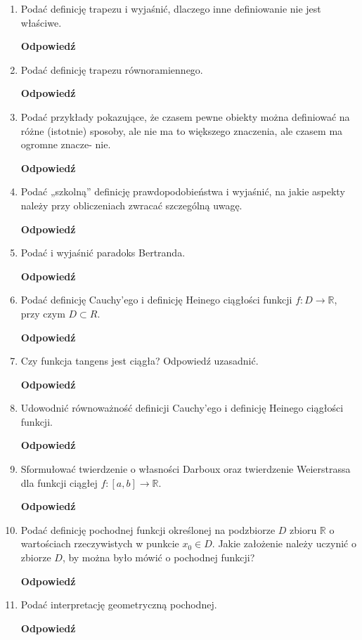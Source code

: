 \documentclass[12pt,a4paper]{article}
\newcounter{twierdzenie}
\theoremstyle{break}
\newcommand{\Odp}[1]{
		\begin{mdframed}[style=zadanie]
			\textbf{Odpowiedź}\\
			#1
		\end{mdframed}
	}
\begin{document}
\begin{enumerate}[1.]
{	}
	
	\item Podać definicję trapezu i wyjaśnić, dlaczego inne definiowanie nie jest właściwe.
	\Odp{
	
	}
	
	\item Podać definicję trapezu równoramiennego.
	\Odp{
	
	}
	
	\item Podać przykłady pokazujące, że czasem pewne obiekty można definiować na różne
	(istotnie) sposoby, ale nie ma to większego znaczenia, ale czasem ma ogromne znacze-
	nie.
	\Odp{
	
	}
	
	\item Podać „szkolną” definicję prawdopodobieństwa i wyjaśnić, na jakie aspekty należy
	przy obliczeniach zwracać szczególną uwagę.
	\Odp{
	
	}
	
	\item Podać i wyjaśnić paradoks Bertranda.
	\Odp{
	
	}
	
	\item Podać definicję Cauchy’ego i definicję Heinego ciągłości funkcji $f : D \rightarrow \mathbb{R}$, przy czym $D \subset R$.
	\Odp{
	
	}
	
	\item Czy funkcja tangens jest ciągła? Odpowiedź uzasadnić.
	\Odp{
		
	}
	
	\item Udowodnić równoważność definicji Cauchy’ego i definicję Heinego ciągłości funkcji.
	\Odp{
	
	}
	
	\item Sformułować twierdzenie o własności Darboux oraz twierdzenie Weierstrassa dla funkcji ciągłej $f : [a, b] \rightarrow \mathbb{R}$.
	\Odp{
	
	}
	
	\item Podać definicję pochodnej funkcji określonej na podzbiorze $D$ zbioru $\mathbb{R}$ o wartościach rzeczywistych w punkcie $x_0 \in D$. Jakie założenie należy uczynić o zbiorze $D$, by można było mówić o pochodnej funkcji?
	\Odp{

	}
	
	\item Podać interpretację geometryczną pochodnej.
	\Odp{
		
}
\end{enumerate}
\end{document}

